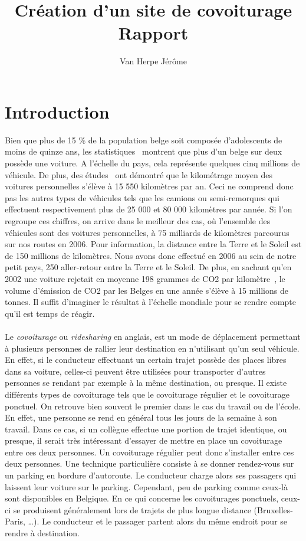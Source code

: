 \documentclass[12pt, a4paper, oneside]{article}
\title{Création d'un site de covoiturage\\ \bigskip{} Rapport}
\author{Van Herpe Jérôme}
\begin{document}
\maketitle
\newpage
\null
\newpage
\renewcommand{\leftmark}{TABLE DES MATI\`{E}RES}
\thispagestyle{fancy}
\tableofcontents
\newpage
\section{Introduction}
    Bien que plus de 15 $\%$ de la population belge soit composée d'adolescents de moins de quinze ans, les statistiques~\cite{stats-mondiale} montrent que plus d'un belge sur deux possède une voiture. A l'échelle du pays, cela représente quelques cinq millions de véhicule. De plus, des études~\cite{stats-ecologie} ont démontré que le kilométrage moyen des voitures personnelles s'élève à 15 550 kilomètres par an. Ceci ne comprend donc pas les autres types de véhicules tels que les camions ou semi-remorques qui effectuent respectivement plus de 25 000 et 80 000 kilomètres par année. Si l'on regroupe ces chiffres, on arrive dans le meilleur des cas, où l'ensemble des véhicules sont des voitures personnelles, à 75 milliards de kilomètres parcourus sur nos routes en 2006. Pour information, la distance entre la Terre et le Soleil est de 150 millions de kilomètres. Nous avons donc effectué en 2006 au sein de notre petit pays, 250 aller-retour entre la Terre et le Soleil. De plus, en sachant qu'en 2002 une voiture rejetait en moyenne 198 grammes de CO2 par kilomètre~\cite{stats-co2}, le volume d'émission de CO2 par les Belges en une année s'élève à 15 millions de tonnes. Il suffit d'imaginer le résultat à l'échelle mondiale pour se rendre compte qu'il est temps de réagir.\\\\
    \indent Le \textit{covoiturage} ou \textit{ridesharing} en anglais, est un mode de déplacement permettant à plusieurs personnes de rallier leur destination en n'utilisant qu'un seul véhicule. En effet, si le conducteur effectuant un certain trajet possède des places libres dans sa voiture, celles-ci peuvent être utilisées pour transporter d'autres personnes se rendant par exemple à la même destination, ou presque. Il existe différents types de covoiturage tels que le covoiturage régulier et le covoiturage ponctuel. On retrouve bien souvent le premier dans le cas du travail ou de l'école. En effet, une personne se rend en général tous les jours de la semaine à son travail. Dans ce cas, si un collègue effectue une portion de trajet identique, ou presque, il serait très intéressant d'essayer de mettre en place un covoiturage entre ces deux personnes. Un covoiturage régulier peut donc s'installer entre ces deux personnes. Une technique particulière consiste à se donner rendez-vous sur un parking en bordure d'autoroute. Le conducteur charge alors ses passagers qui laissent leur voiture sur le parking. Cependant, peu de parking comme ceux-là sont disponibles en Belgique. En ce qui concerne les covoiturages ponctuels, ceux-ci se produisent généralement lors de trajets de plus longue distance (Bruxelles-Paris, \dots). Le conducteur et le passager partent alors du même endroit pour se rendre à destination.\\\\
\end{document}
